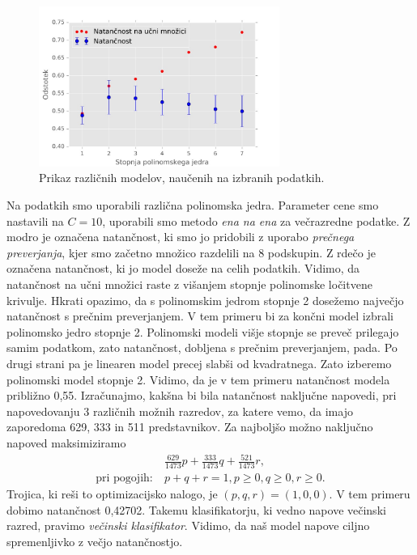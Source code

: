 \documentclass[mat1]{fmfdelo}
\begin{document}
\begin{figure}[ht]
	\centering
	\includegraphics[width=0.70\textwidth]{slike/Natancnost.jpg}
	\caption{Prikaz različnih modelov, naučenih na izbranih podatkih.}
	\label{slikaNatancnostPolinom}
\end{figure}
Na podatkih smo uporabili različna polinomska jedra. Parameter cene smo nastavili na $C = 10$, uporabili smo metodo \emph{ena na ena} za večrazredne podatke. Z modro je označena natančnost, ki smo jo pridobili z uporabo \emph{prečnega preverjanja}, kjer smo začetno množico razdelili na $8$ podskupin. Z rdečo je označena natančnost, ki jo model doseže na celih podatkih. Vidimo, da natančnost na učni množici raste z višanjem stopnje polinomske ločitvene krivulje. Hkrati opazimo, da s polinomskim jedrom stopnje 2 dosežemo največjo natančnost s prečnim preverjanjem. V tem primeru bi za končni model izbrali polinomsko jedro stopnje 2. Polinomski modeli višje stopnje se preveč prilegajo samim podatkom, zato natančnost, dobljena s prečnim preverjanjem, pada. Po drugi strani pa je linearen model precej slabši od kvadratnega. Zato izberemo polinomski model stopnje 2. Vidimo, da je v tem primeru natančnost modela približno 0,55. Izračunajmo, kakšna bi bila natančnost naključne napovedi, pri napovedovanju 3 različnih možnih razredov, za katere vemo, da imajo zaporedoma 629, 333 in 511 predstavnikov. Za najboljšo možno naključno napoved maksimiziramo
\begin{align*}
	&\frac{629}{1473}p + \frac{333}{1473}q + \frac{521}{1473}r, \\
	\text{pri pogojih:}~&p + q + r = 1, p \ge 0, q \ge 0, r \ge 0. 
\end{align*} 
Trojica, ki reši to optimizacijsko nalogo, je $(p,q,r) = (1, 0, 0)$. V tem primeru dobimo natančnost 0,42702. Takemu klasifikatorju, ki vedno napove večinski razred, pravimo \emph{večinski klasifikator}. Vidimo, da naš model napove ciljno spremenljivko z večjo natančnostjo.
\end{document}
